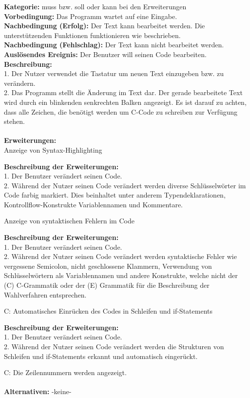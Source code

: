 \documentclass[a4paper]{scrreprt}
\begin{document}
\textbf{Kategorie:} muss bzw. soll oder kann bei den Erweiterungen\\
\textbf{Vorbedingung:} Das Programm wartet auf eine Eingabe.\\
\textbf{Nachbedingung (Erfolg):} Der Text kann bearbeitet werden. Die unterstützenden Funktionen funktionieren wie beschrieben.\\
\textbf{Nachbedingung (Fehlschlag):} Der Text kann nicht bearbeitet werden.\\
\textbf{Auslösendes Ereignis:} Der Benutzer will seinen Code bearbeiten.\\
\textbf{Beschreibung:} \\
1. Der Nutzer verwendet die Tastatur um neuen Text einzugeben bzw. zu verändern.\\
2. Das Programm stellt die Änderung im Text dar. Der gerade bearbeitete Text wird durch ein blinkenden senkrechten Balken angezeigt. Es ist darauf zu achten, dass alle Zeichen, die benötigt werden um C-Code zu schreiben zur Verfügung stehen.\\\\
\textbf {Erweiterungen:}\\
Anzeige von Syntax-Highlighting
\begin{addmargin}[15pt]{0pt}
\textbf{Beschreibung der Erweiterungen:}\\
1. Der Benutzer verändert seinen Code. \\
2. Während der Nutzer seinen Code verändert werden diverse Schlüsselwörter im Code farbig markiert. Dies beinhaltet unter anderem Typendeklarationen, Kontrollflow-Konstrukte Variablennamen und Kommentare. \\
\end{addmargin}
Anzeige von syntaktischen Fehlern im Code
\begin{addmargin}[15pt]{0pt}
\textbf{Beschreibung der Erweiterungen:}\\
1. Der Benutzer verändert seinen Code. \\
2. Während der Nutzer seinen Code verändert werden syntaktische Fehler wie vergessene Semicolon, nicht geschlossene Klammern, Verwendung von Schlüsselwörtern als Variablennamen und andere Konstrukte, welche nicht der (C) C-Grammatik oder der (E) Grammatik für die Beschreibung der Wahlverfahren entsprechen. \\
\end{addmargin}
C: Automatisches Einrücken des Codes in Schleifen und if-Statements 
\begin{addmargin}[15pt]{0pt}
\textbf{Beschreibung der Erweiterungen:}\\
1. Der Benutzer verändert seinen Code. \\
2. Während der Nutzer seinen Code verändert werden die Strukturen von Schleifen und if-Statements erkannt und automatisch eingerückt. \\
\end{addmargin}
C: Die Zeilennummern werden angezeigt. \\ \\
\textbf{Alternativen:} -keine- \\
\end{document}
